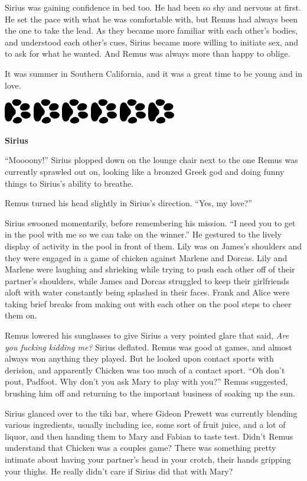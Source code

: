 \documentclass[12pt,twoside,openright]{memoir}
\newcommand{\myrulez}{	
	\begin{center}
		\hspace{.5em}
		\includegraphics[angle=60]{dogprint.pdf}
		\hspace{.5em}
		\includegraphics[angle=120]{dogprint.pdf}
		\hspace{.5em}
		\includegraphics[angle=60]{dogprint.pdf}
		\hspace{.5em}
		\includegraphics[angle=120]{dogprint.pdf}
		\hspace{.5em}
		\includegraphics[angle=60]{dogprint.pdf}
		\hspace{.5em}
		\includegraphics[angle=120]{dogprint.pdf}
		\hspace{.5em}
	\end{center}
}
\begin{document}
Sirius was gaining confidence in bed too. He had been so shy and nervous at first. He set the pace with what he was comfortable with, but Remus had always been the one to take the lead. As they became more familiar with each other's bodies, and understood each other's cues, Sirius became more willing to initiate sex, and to ask for what he wanted. And Remus was always more than happy to oblige. 

It was summer in Southern California, and it was a great time to be young and in love.

\myrulez

\textbf{Sirius} 

``Moooony!'' Sirius plopped down on the lounge chair next to the one Remus was currently sprawled out on, looking like a bronzed Greek god and doing funny things to Sirius's ability to breathe.

Remus turned his head slightly in Sirius's direction. ``Yes, my love?''

Sirius swooned momentarily, before remembering his mission. ``I need you to get in the pool with me so we can take on the winner.'' He gestured to the lively display of activity in the pool in front of them. Lily was on James's shoulders and they were engaged in a game of chicken against Marlene and Dorcas. Lily and Marlene were laughing and shrieking while trying to push each other off of their partner's shoulders, while James and Dorcas struggled to keep their girlfriends aloft with water constantly being splashed in their faces. Frank and Alice were taking brief breaks from making out with each other on the pool steps to cheer them on.

Remus lowered his sunglasses to give Sirius a very pointed glare that said, \textit{Are you fucking kidding me?} Sirius deflated. Remus was good at games, and almost always won anything they played. But he looked upon contact sports with derision, and apparently Chicken was too much of a contact sport. ``Oh don't pout, Padfoot. Why don't you ask Mary to play with you?'' Remus suggested, brushing him off and returning to the important business of soaking up the sun.

Sirius glanced over to the tiki bar, where Gideon Prewett was currently blending various ingredients, usually including ice, some sort of fruit juice, and a lot of liquor, and then handing them to Mary and Fabian to taste test. Didn't Remus understand that Chicken was a couples game? There was something pretty intimate about having your partner's head in your crotch, their hands gripping your thighs. He really didn't care if Sirius did that with Mary?
\end{document}
